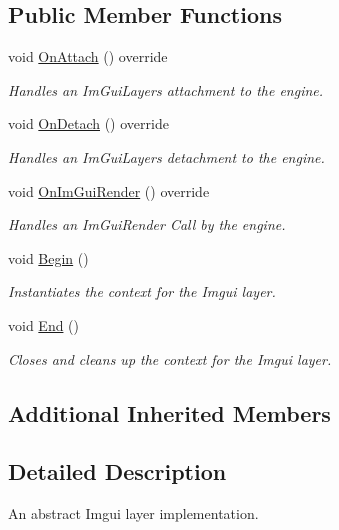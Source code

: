 \subsection*{Public Member Functions}
\begin{DoxyCompactItemize}
\item 
void \hyperlink{classengine_1_1imgui_1_1ImGuiLayer_a8580bd31942d4bc33f268053d2adec31}{On\+Attach} () override
\begin{DoxyCompactList}\small\item\em Handles an Im\+Gui\+Layers attachment to the engine. \end{DoxyCompactList}\item 
void \hyperlink{classengine_1_1imgui_1_1ImGuiLayer_ad443a984abe93f4101fdbadcea01bf9b}{On\+Detach} () override
\begin{DoxyCompactList}\small\item\em Handles an Im\+Gui\+Layers detachment to the engine. \end{DoxyCompactList}\item 
void \hyperlink{classengine_1_1imgui_1_1ImGuiLayer_aeacc4aecfc119192fbe98e961b88813e}{On\+Im\+Gui\+Render} () override
\begin{DoxyCompactList}\small\item\em Handles an Im\+Gui\+Render Call by the engine. \end{DoxyCompactList}\item 
void \hyperlink{classengine_1_1imgui_1_1ImGuiLayer_aaecbd780bfe93ea0b85c9b31c3a931de}{Begin} ()
\begin{DoxyCompactList}\small\item\em Instantiates the context for the Imgui layer. \end{DoxyCompactList}\item 
void \hyperlink{classengine_1_1imgui_1_1ImGuiLayer_aca4c57dc3361ed5c4c75a9c43b8dc1e6}{End} ()
\begin{DoxyCompactList}\small\item\em Closes and cleans up the context for the Imgui layer. \end{DoxyCompactList}\end{DoxyCompactItemize}
\subsection*{Additional Inherited Members}


\subsection{Detailed Description}
An abstract Imgui layer implementation. 

